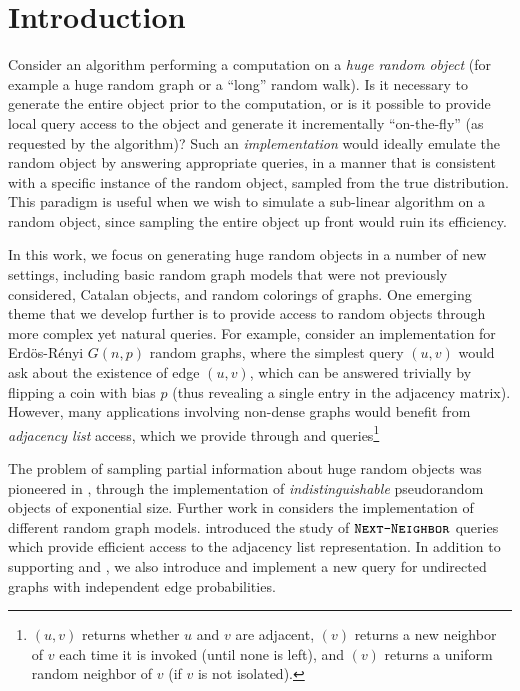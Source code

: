 \section{Introduction}
Consider an algorithm performing a computation on a \emph{huge random object} (for example a huge random graph or a ``long'' random walk).
Is it necessary to generate the entire object prior to the computation,
or is it possible to provide local query access to the object and generate it incrementally ``on-the-fly'' (as requested by the algorithm)?
Such an \emph{implementation} would ideally emulate the random object by answering appropriate queries,
in a manner that is consistent with a specific instance of the random object, sampled from the true distribution.
This paradigm is useful when we wish to simulate a sub-linear algorithm on a random object,
since sampling the entire object up front would ruin its efficiency.

In this work, we focus on generating huge random objects in a number of new settings,
including basic random graph models that were not previously considered, Catalan objects, and random colorings of graphs.
One emerging theme that we develop further is to provide access to random objects through more complex yet natural queries.
For example, consider an implementation for Erd\"os-R\'enyi $G(n,p)$ random graphs,
where the simplest query $(u,v)$ would ask about the existence of edge $(u,v)$,
which can be answered trivially by flipping a coin with bias $p$ (thus revealing a single entry in the adjacency matrix).
However, many applications involving non-dense graphs would benefit from \emph{adjacency list} access,
which we provide through  and  queries\footnote{
\label{foot:graph_queries}
$(u,v)$ returns whether $u$ and $v$ are adjacent, $(v)$ returns a new neighbor of $v$ each time
it is invoked (until none is left), and $(v)$ returns a uniform random neighbor of $v$ (if $v$ is not isolated).}

The problem of sampling partial information about huge random objects was pioneered in \cite{huge,huge_old,huge_journal},
through the implementation of \emph{indistinguishable} pseudorandom objects of exponential size.
Further work in \cite{sparse,reut} considers the implementation of different random graph models.
\cite{reut} introduced the study of $\texttt{\textsc{Next-Neighbor}}$ queries which provide efficient access to the adjacency list representation.
In addition to supporting  and ,
we also introduce and implement a new  query for undirected graphs with independent edge probabilities.


